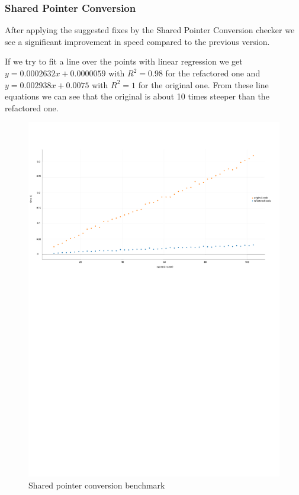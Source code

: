 \subsubsection{Shared Pointer Conversion}
\par After applying the suggested fixes by the Shared Pointer Conversion checker we see a significant improvement in speed compared to the previous version. \medskip
\par If we try to fit a line over the points with linear regression we get $y=0.0002632x+0.0000059$ with $R^2=0.98$ for the refactored one and $y = 0.002938x+0.0075$ with $R^2=1$ for the original one. From these line equations we can see that the original is about 10 times steeper than the refactored one. 
\begin{figure}[H]
	\caption{Shared pointer conversion benchmark}
	\includegraphics[scale=0.7]{images/shared_ptr_performance.pdf}
\end{figure}
